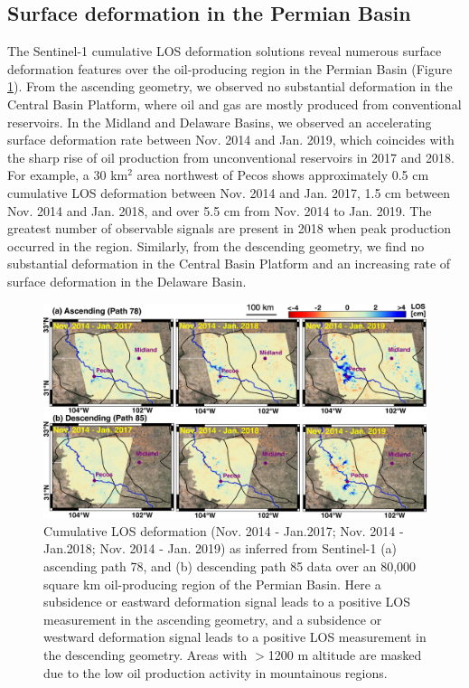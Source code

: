 \subsection{Surface deformation in the Permian Basin}
The Sentinel-1 cumulative LOS deformation solutions reveal numerous surface deformation features over the oil-producing region in the Permian Basin (Figure \ref{fig:insar-los}). From the ascending geometry, we observed no substantial deformation in the Central Basin Platform, where oil and gas are mostly produced from conventional reservoirs. In the Midland and Delaware Basins, we observed an accelerating surface deformation rate between Nov. 2014 and Jan. 2019, which coincides with the sharp rise of oil production from unconventional reservoirs in 2017 and 2018. For example, a 30 km$^2 $ area northwest of Pecos shows approximately 0.5 cm cumulative LOS deformation between Nov. 2014 and Jan. 2017, 1.5 cm between Nov. 2014 and Jan. 2018, and over 5.5 cm from Nov. 2014 to Jan. 2019. The greatest number of observable signals are present in 2018 when peak production occurred in the region. Similarly, from the descending geometry, we find no substantial deformation in the Central Basin Platform and an increasing rate of surface deformation in the Delaware Basin. 


\begin{figure}[hbt!]
	\centering
	\includegraphics[width=.96\linewidth]{paper1-permian/figures/figure3-los-insar.pdf}
	\caption[Cumulative LOS deformation for path 78 and path 85]{Cumulative LOS deformation (Nov. 2014 - Jan.2017; Nov. 2014 - Jan.2018; Nov. 2014 - Jan. 2019) as inferred from Sentinel-1 (a) ascending path 78, and (b) descending path 85 data over an 80,000 square km oil-producing region of the Permian Basin. Here a subsidence or eastward deformation signal leads to a positive LOS measurement in the ascending geometry, and a subsidence or westward deformation signal leads to a positive LOS measurement in the descending geometry. Areas with $>$1200 m altitude are masked due to the low oil production activity in mountainous regions.}
	\label{fig:insar-los}
\end{figure}

